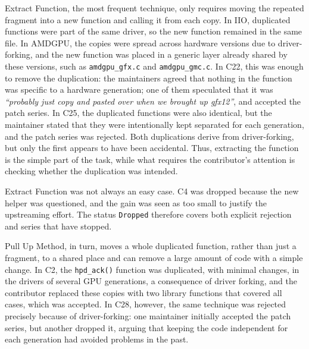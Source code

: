 \documentclass[10pt,conference]{IEEEtran}
\begin{document}
Extract Function, the most frequent technique, only requires moving the repeated fragment into a new function and calling it from each copy. In IIO, duplicated functions were part of the same driver, so the new function remained in the same file. In AMDGPU, the copies were spread across hardware versions due to driver-forking, and the new function was placed in a generic layer already shared by these versions, such as \texttt{amdgpu\_gfx.c} and \texttt{amdgpu\_gmc.c}. In C22, this was enough to remove the duplication: the maintainers agreed that nothing in the function was specific to a hardware generation; one of them speculated that it was \textit{``probably just copy and pasted over when we brought up gfx12''}, and accepted the patch series. In C25, the duplicated functions were also identical, but the maintainer stated that they were intentionally kept separated for each generation, and the patch series was rejected. Both duplications derive from driver-forking, but only the first appears to have been accidental. Thus, extracting the function is the simple part of the task, while what requires the contributor's attention is checking whether the duplication was intended.

Extract Function was not always an easy case. C4 was dropped because the new helper was questioned, and the gain was seen as too small to justify the upstreaming effort. The status \texttt{Dropped} therefore covers both explicit rejection and series that have stopped.

Pull Up Method, in turn, moves a whole duplicated function, rather than just a fragment, to a shared place and can remove a large amount of code with a simple change. In C2, the \texttt{hpd\_ack()} function was duplicated, with minimal changes, in the drivers of several GPU generations, a consequence of driver forking, and the contributor replaced these copies with two library functions that covered all cases, which was accepted. In C28, however, the same technique was rejected precisely because of driver-forking: one maintainer initially accepted the patch series, but another dropped it, arguing that keeping the code independent for each generation had avoided problems in the past.
\end{document}
